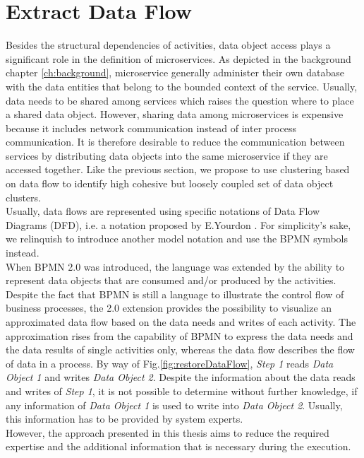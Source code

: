 \section{Extract Data Flow}
\label{sec:Solution:ExtractDataFlow}
Besides the structural dependencies of activities, data object access plays a significant role in the definition of microservices. As depicted in the background chapter \ref{ch:background}, microservice generally administer their own database with the data entities that belong to the bounded context of the service. Usually, data needs to be shared among services which raises the question where to place a shared data object. However, sharing data among microservices is expensive because it includes network communication instead of inter process communication. It is therefore desirable to reduce the communication between services by distributing data objects into the same microservice if they are accessed together.  
Like the previous section, we propose to use clustering based on data flow to identify high cohesive but loosely coupled set of data object clusters. \\
Usually, data flows are represented using specific notations of Data Flow Diagrams (DFD), i.e. a notation proposed by E.Yourdon \cite{YourdonDFD}. For simplicity's sake, we relinquish to introduce another model notation and use the BPMN symbols instead. \\
When BPMN 2.0 was introduced, the language was extended by the ability to represent data objects that are consumed and/or produced by the activities. Despite the fact that BPMN is still a language to illustrate the control flow of business processes, the 2.0 extension provides the possibility to visualize an approximated data flow based on the data needs and writes of each activity. The approximation rises from the capability of BPMN to express the data needs and the data results of single activities only, whereas the data flow describes the flow of data in a process. By way of Fig.\ref{fig:restoreDataFlow}, \textit{Step 1} reads \textit{Data Object 1} and writes \textit{Data Object 2}. Despite the information about the data reads and writes of \textit{Step 1}, it is not possible to determine without further knowledge, if any information of \textit{Data Object 1} is used to write into \textit{Data Object 2}. Usually, this information has to be provided by system experts. \\
However, the approach presented in this thesis aims to reduce the required expertise and the additional information that is necessary during the execution. 
